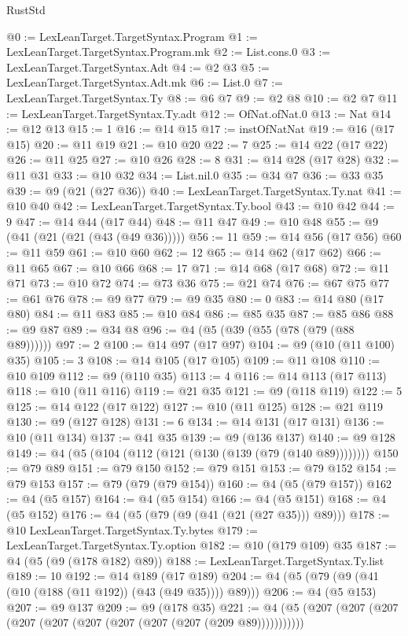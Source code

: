 \begin{lexlean}{RustStd}
\begin{coremodule}
@0 := LexLeanTarget.TargetSyntax.Program
@1 := LexLeanTarget.TargetSyntax.Program.mk
@2 := List.cons.{0}
@3 := LexLeanTarget.TargetSyntax.Adt
@4 := @2 @3
@5 := LexLeanTarget.TargetSyntax.Adt.mk
@6 := List.{0}
@7 := LexLeanTarget.TargetSyntax.Ty
@8 := @6 @7
@9 := @2 @8
@10 := @2 @7
@11 := LexLeanTarget.TargetSyntax.Ty.adt
@12 := OfNat.ofNat.{0}
@13 := Nat
@14 := @12 @13
@15 := 1
@16 := @14 @15
@17 := instOfNatNat
@19 := @16 (@17 @15)
@20 := @11 @19
@21 := @10 @20
@22 := 7
@25 := @14 @22 (@17 @22)
@26 := @11 @25
@27 := @10 @26
@28 := 8
@31 := @14 @28 (@17 @28)
@32 := @11 @31
@33 := @10 @32
@34 := List.nil.{0}
@35 := @34 @7
@36 := @33 @35
@39 := @9 (@21 (@27 @36))
@40 := LexLeanTarget.TargetSyntax.Ty.nat
@41 := @10 @40
@42 := LexLeanTarget.TargetSyntax.Ty.bool
@43 := @10 @42
@44 := 9
@47 := @14 @44 (@17 @44)
@48 := @11 @47
@49 := @10 @48
@55 := @9 (@41 (@21 (@21 (@43 (@49 @36)))))
@56 := 11
@59 := @14 @56 (@17 @56)
@60 := @11 @59
@61 := @10 @60
@62 := 12
@65 := @14 @62 (@17 @62)
@66 := @11 @65
@67 := @10 @66
@68 := 17
@71 := @14 @68 (@17 @68)
@72 := @11 @71
@73 := @10 @72
@74 := @73 @36
@75 := @21 @74
@76 := @67 @75
@77 := @61 @76
@78 := @9 @77
@79 := @9 @35
@80 := 0
@83 := @14 @80 (@17 @80)
@84 := @11 @83
@85 := @10 @84
@86 := @85 @35
@87 := @85 @86
@88 := @9 @87
@89 := @34 @8
@96 := @4 (@5 (@39 (@55 (@78 (@79 (@88 @89))))))
@97 := 2
@100 := @14 @97 (@17 @97)
@104 := @9 (@10 (@11 @100) @35)
@105 := 3
@108 := @14 @105 (@17 @105)
@109 := @11 @108
@110 := @10 @109
@112 := @9 (@110 @35)
@113 := 4
@116 := @14 @113 (@17 @113)
@118 := @10 (@11 @116)
@119 := @21 @35
@121 := @9 (@118 @119)
@122 := 5
@125 := @14 @122 (@17 @122)
@127 := @10 (@11 @125)
@128 := @21 @119
@130 := @9 (@127 @128)
@131 := 6
@134 := @14 @131 (@17 @131)
@136 := @10 (@11 @134)
@137 := @41 @35
@139 := @9 (@136 @137)
@140 := @9 @128
@149 := @4 (@5 (@104 (@112 (@121 (@130 (@139 (@79 (@140 @89))))))))
@150 := @79 @89
@151 := @79 @150
@152 := @79 @151
@153 := @79 @152
@154 := @79 @153
@157 := @79 (@79 (@79 @154))
@160 := @4 (@5 (@79 @157))
@162 := @4 (@5 @157)
@164 := @4 (@5 @154)
@166 := @4 (@5 @151)
@168 := @4 (@5 @152)
@176 := @4 (@5 (@79 (@9 (@41 (@21 (@27 @35))) @89)))
@178 := @10 LexLeanTarget.TargetSyntax.Ty.bytes
@179 := LexLeanTarget.TargetSyntax.Ty.option
@182 := @10 (@179 @109) @35
@187 := @4 (@5 (@9 (@178 @182) @89))
@188 := LexLeanTarget.TargetSyntax.Ty.list
@189 := 10
@192 := @14 @189 (@17 @189)
@204 := @4 (@5 (@79 (@9 (@41 (@10 (@188 (@11 @192)) (@43 (@49 @35)))) @89)))
@206 := @4 (@5 @153)
@207 := @9 @137
@209 := @9 (@178 @35)
@221 := @4 (@5 (@207 (@207 (@207 (@207 (@207 (@207 (@207 (@207 (@207 (@209 @89)))))))))))

\end{coremodule}
\end{lexlean}
